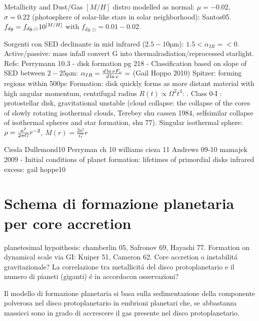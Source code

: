 \begin{workout}
\begin{workout}
{Metallicity and Dust/Gas}
$[M/H]$ distro modelled as normal: $\mu=-0.02$, $\sigma=0.22$ (photosphere of solar-like stars in solar neighborhood): Santos05.
$f_{dg}=f_{dg,\odot}10^{[M/H]}$ with $f_{dg,\odot}=0.01-0.02$.
\end{workout}

\begin{workout}
Sorgenti con SED declinante in mid infrared ($2.5-10\si{\micro\meter}$): $1.5<\alpha_{IR}=<0$. Active/passive: mass infall convert G into thermalradiation/reprocessed starlight.
Refs: Perrymann 10.3 - disk formation pg 218 - 
Classification based on slope of SED between $2-25\si{\micro\meter}$: $\alpha_{IR}=\frac{d \ln{\nu F_{\nu}}}{d \ln{\nu}}=$ (Gail Hoppo 2010)
Spitzer: forming regions within 500pc
Formation: disk quickly forms as more distant material with high angular momentum, centrifugal radius $R(t)\propto\Omega^2 t^3$: . Class 0-I : protostellar disk, gravitational unstable (cloud collapse: the collapse of the cores of slowly rotating isothermal clouds, Terebey shu cassen 1984, selfsimilar collapse of isothermal spheres and star formation, shu 77). Singular isothermal sphere: $\rho=\frac{a^2}{2\pi G}r^{-2}$, $M(r)=\frac{2a^2}{G}r$
\end{workout}

\begin{workout}
Ciesla Dullemond10 
Perryman ch 10
williams cieza 11
Andrews 09-10
mamajek 2009 - Initial conditions of planet formation: lifetimes of primordial disks
infrared excess: gail hoppe10
\end{workout}


{\let\clearpage\relax\let\cleardoublepage\relax
\chapter{Schema di formazione planetaria per core accretion}
}

\begin{workout}[Refs GI vs CA]
planetesimal hypoithesis: chamberlin 05, Safronov 69, Hayashi 77. Formation on dynamical scale via GI: Kuiper 51, Cameron 62.
Core accretion o instabilit\'a gravitazionale?
La correlazione tra metallicit\'a del disco protoplanetario e il numero di pianeti (giganti) \'e in accordocon osservazioni?
\end{workout}


Il modello di formazione planetaria si basa sulla sedimentazione della componente polverosa nel disco protoplanetario in embrioni planetari che, se abbastanza massicci sono in grado di accrescere il gas presente nel disco protoplanetario.


\end{workout}
